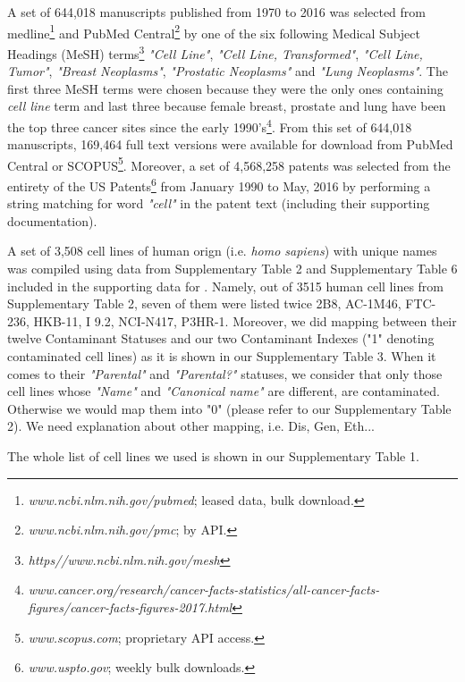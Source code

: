 \documentclass[10pt]{article}
\begin{document}
A set of {\color{blue}644,018} manuscripts published from 1970 to 2016 was selected from medline\footnote{\textit{www.ncbi.nlm.nih.gov/pubmed}; leased data, bulk download.} and PubMed Central\footnote{\textit{www.ncbi.nlm.nih.gov/pmc}; by API.} by one of the six following Medical Subject Headings (MeSH) terms\footnote{\textit{https//www.ncbi.nlm.nih.gov/mesh}} \textit{"Cell Line"}, \textit{"Cell Line, Transformed"}, \textit{"Cell Line, Tumor"}, \textit{"Breast Neoplasms"}, \textit{"Prostatic Neoplasms"} and \textit{"Lung Neoplasms"}. The first three MeSH terms were chosen because they were the {\color{blue}only ones} containing \textit{cell line} term and last three because female breast, prostate and lung have been the top three cancer sites since the early 1990's\footnote{\textit{www.cancer.org/research/cancer-facts-statistics/all-cancer-facts-figures/cancer-facts-figures-2017.html}}. From this set of {\color{blue}644,018} manuscripts, {\color{blue}169,464} full text versions were available for download from PubMed Central or SCOPUS\footnote{\textit{www.scopus.com}; proprietary API access.}. Moreover, a set of {\color{blue}4,568,258} patents was selected from the entirety of the US Patents\footnote{\textit{www.uspto.gov}; weekly bulk downloads.} from {\color{blue}January 1990} to May, 2016 by performing a string matching for word \textit{"cell"} in the patent text (including their supporting documentation).

A set of 3,508 cell lines of human orign (i.e. \textit{homo sapiens}) with unique names was compiled using data from Supplementary Table 2 and Supplementary Table 6 included in the supporting data for \cite{yu2015resource}. Namely, out of 3515 human cell lines from Supplementary Table 2, seven of them were listed twice 2B8, AC-1M46, FTC-236, HKB-11, I 9.2, NCI-N417, P3HR-1. Moreover, we did mapping between their twelve Contaminant Statuses and our two Contaminant Indexes ("1" denoting contaminated cell lines) as it is shown in our Supplementary Table 3. When it comes to their \textit{"Parental"} and \textit{"Parental?"} statuses, we consider that only those cell lines whose \textit{"Name"} and \textit{"Canonical name"} are different, are contaminated. Otherwise we would map them into "0" (please refer to our Supplementary Table 2). {\color{red} We need explanation about other mapping, i.e. Dis, Gen, Eth...}


The whole list of cell lines we used is shown in our Supplementary Table 1.
\end{document}
